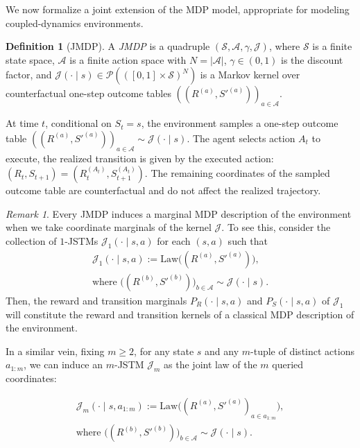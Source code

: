 \documentclass[accepted]{uai2026}
\theoremstyle{plain}
\theoremstyle{definition}
\newtheorem{definition}[theorem]{Definition}
\theoremstyle{remark}
\newtheorem{remark}[theorem]{Remark}
\newcommand{\A}{\mathcal{A}}
\newcommand{\Ss}{\mathcal{S}}
\newcommand{\Law}{\mathrm{Law}}
\newcommand{\1}{\mathbbm{1}}
\newcommand{\abs}[1]{\left\lvert #1\right\rvert}
\begin{document}
We now formalize a joint extension of the MDP model, appropriate for modeling coupled-dynamics environments.
\begin{definition}[JMDP]
A \textit{JMDP} is a quadruple $(\Ss, \allowbreak\A, \allowbreak\gamma, \allowbreak\mathcal{J})$, where $\Ss$ is a finite state space, $\A$ is a finite action space with $N = \abs{\A}$, $\gamma \in (0, 1)$ is the discount factor, and $\mathcal{J}(\cdot \mid s) \in \mathcal{P}(([0, 1] \times \Ss)^N)$ is a Markov kernel over counterfactual one-step outcome tables $( (R^{(a)}, S'^{(a)}))_{a \in \A}$. 

At time $t$, conditional on $S_t = s$, the environment samples a one-step outcome table $((R^{(a)}, S'^{(a)}))_{a \in \A} \sim \mathcal{J}(\cdot \mid s)$. The agent selects action $A_t$ to execute, the realized transition is given by the executed action: $(R_t, S_{t+1}) = (R_t^{(A_t)}, S_{t+1}^{(A_t)}).$ The remaining coordinates of the sampled outcome table are counterfactual and do not affect the realized trajectory.
\end{definition}
\begin{remark}
Every JMDP induces a marginal MDP description of the environment when we take coordinate marginals of the kernel $\mathcal{J}$. To see this, consider the collection of $1$-JSTMs $\mathcal{J}_1(\cdot \mid s, a)$ for each $(s, a)$ such that
\begin{equation}
\begin{gathered}
\mathcal{J}_{1}(\cdot\mid s, a):=\Law\big( (R^{(a)}, S'^{(a)})\big), \\
\text{where } \big((R^{(b)}, S'^{(b)}) \big)_{b \in \A} \sim \mathcal{J}(\cdot\mid s).
\end{gathered}
\end{equation}
Then, the reward and transition marginals $P_R(\cdot \mid s, a)$ and $P_S(\cdot \mid s, a)$ of $\mathcal{J}_{1}$ will constitute the reward and transition kernels of a classical MDP description of the environment.

In a similar vein, fixing $m \ge 2$, for any state $s$ and any $m$-tuple of distinct actions $a_{1:m}$, we can induce an $m$-JSTM $\mathcal{J}_m$ as the joint law of the $m$ queried coordinates:
\end{remark}
\begin{equation}
\begin{gathered}
\mathcal{J}_{m}(\cdot\mid s, a_{1:m}):=\Law\big( (R^{(a)}, S'^{(a)})_{a \in a_{1:m}}\big), \\
\text{where } \big((R^{(b)}, S'^{(b)}) \big)_{b \in \A} \sim \mathcal{J}(\cdot\mid s).
\end{gathered}
\end{equation}
\end{document}
